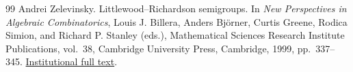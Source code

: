 \begin{thebibliography}{99}
Andrei Zelevinsky.
Littlewood--Richardson semigroups.
In \emph{New Perspectives in Algebraic Combinatorics},
Louis J. Billera, Anders Bj{\"o}rner, Curtis Greene, Rodica Simion,
and Richard P. Stanley (eds.),
Mathematical Sciences Research Institute Publications, vol.~38,
Cambridge University Press, Cambridge, 1999, pp.~337--345.
\href{https://library.slmath.org/books/Book38/files/zelevinsky.pdf}{Institutional full text}.

\end{thebibliography}

